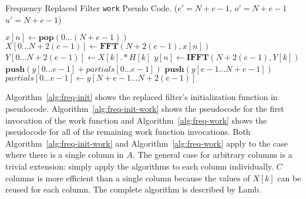 \begin{algorithm}
  \caption{Frequency Replaced Filter {\tt work} Pseudo Code. 
    ($e'=N+e-1$, $o'=N+e-1$ $u'=N+e-1$)\label{alg:freq-work}}
  \begin{algorithmic}
    \STATE $x[n] \leftarrow \mathbf{pop}(0 \dots (N+e-1))$
    \STATE $X[0 \dots N+2(e-1)] \leftarrow \mathbf{FFT} (N+2(e-1), x[n])$
    \STATE $Y[0 \dots N+2(e-1)] \leftarrow X[k] .* H[k]$
    \STATE $y[n] \leftarrow \mathbf{IFFT}(N+2(e-1), Y[k])$
    \STATE $\mathbf{push}(y[0 \dots e-1] + partials[0 \dots e-1])$
    \STATE $\mathbf{push}(y[e-1 \dots N+e-1])$
    \STATE $partials[0 \dots e-1] \leftarrow y[N+e-1 \dots N+2(e-1)]$
  \end{algorithmic}
\end{algorithm}

Algorithm~\ref{alg:freq-init} shows the replaced filter's initialization
function in pseudocode. Algorithm~\ref{alg:freq-init-work} shows the 
pseudocode for the first invocation of the work function and
Algorithm~\ref{alg:freq-work} shows the pseudocode for all of the 
remaining work function invocations. Both Algorithm~\ref{alg:freq-init-work}
and Algorithm~\ref{alg:freq-work} apply to the case where there is a single
column in $A$. The general case for arbitrary columns is a trivial extension:
simply apply the algorithms to each column individually. $C$ columns
is more efficient than a single column because the values of $X[k]$ can 
be reused for each column. The complete algorithm is described by 
Lamb\cite{lamb-thesis}. 



